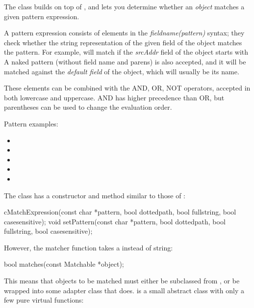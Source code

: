 The  class builds on top of ,
and lets you determine whether an \textit{object} matches a given pattern
expression.

A pattern expression consists of elements in the
\textit{fieldname(pattern)} syntax; they check whether the string
representation of the given field of the object matches the pattern. For
example,  will match if the \textit{srcAddr}
field of the object starts with  A naked pattern (without
field name and parens) is also accepted, and it will be matched against the
\textit{default field} of the object, which will usually be its name.

These elements can be combined with the AND, OR, NOT operators, accepted in
both lowercase and uppercase. AND has higher precedence than OR, but
parentheses can be used to change the evaluation order.

Pattern examples:

\begin{itemize}
 \item {}
 \item {}
 \item {}
 \item {}
 \item {}
\end{itemize}

The  class has a constructor and 
method similar to those of :

\begin{cpp}
cMatchExpression(const char *pattern, bool dottedpath, bool fullstring,
                bool casesensitive);
void setPattern(const char *pattern, bool dottedpath, bool fullstring,
                bool casesensitive);
\end{cpp}

However, the matcher function takes a 
instead of string:

\begin{cpp}
bool matches(const Matchable *object);
\end{cpp}

This means that objects to be matched must either be subclassed from
, or be wrapped into some adapter class
that does.  is a small abstract class
with only a few pure virtual functions:

